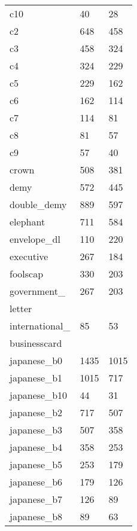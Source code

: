 {\begin{supertabular}{|lll|}
                        c10 &     40 &     28 \\
                         c2 &    648 &    458 \\
                         c3 &    458 &    324 \\
                         c4 &    324 &    229 \\
                         c5 &    229 &    162 \\
                         c6 &    162 &    114 \\
                         c7 &    114 &     81 \\
                         c8 &     81 &     57 \\
                         c9 &     57 &     40 \\
                      crown &    508 &    381 \\
                       demy &    572 &    445 \\
               double\_demy &    889 &    597\\
                   elephant &    711 &    584 \\
               envelope\_dl &    110 &    220\\
                  executive &    267 &    184 \\
                   foolscap &    330 &    203\\
         government\_       &    267 &    203\\
\hfill               letter &        &       \\
international\_             &     85 &     53\\
\hfill         businesscard &        &       \\
               japanese\_b0 &   1435 &   1015\\
               japanese\_b1 &   1015 &    717\\
              japanese\_b10 &     44 &     31\\
               japanese\_b2 &    717 &    507\\
               japanese\_b3 &    507 &    358\\
               japanese\_b4 &    358 &    253\\
               japanese\_b5 &    253 &    179\\
               japanese\_b6 &    179 &    126\\
               japanese\_b7 &    126 &     89\\
               japanese\_b8 &     89 &     63\\

\end{supertabular}}
